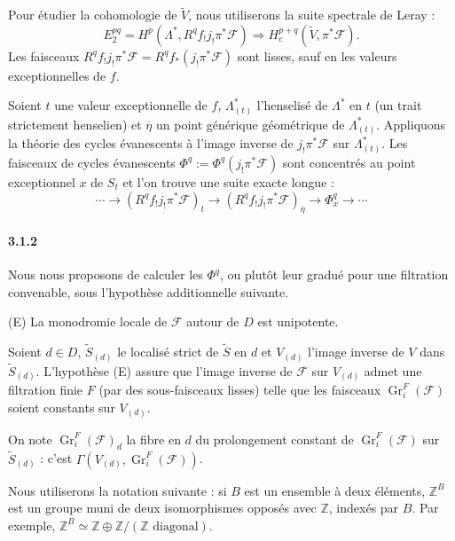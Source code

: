 \documentclass[12pt,a4paper]{article}
\theoremstyle{plain}
\theoremstyle{definition}
\theoremstyle{remark}
\DeclareMathOperator{\Gr}{Gr}
\newcommand{\ZZ}{{\mathbb{Z}}}
\begin{document}
Pour \'etudier la cohomologie de $\widetilde{V}$, nous utiliserons la suite spectrale de Leray :
\begin{equation}\label{eq:3.1.1.5}
E_2^{pq} = H^p(\Lambda^*, R^q f_! j_! \pi^* \mathscr{F}) \Rightarrow H_c^{p+q}(\widetilde{V}, \pi^*\mathscr{F}).
\end{equation}
Les faisceaux $R^q f_! j_! \pi^*\mathscr{F} = R^q f_*(j_! \pi^*\mathscr{F})$ sont lisses, sauf en les valeurs exceptionnelles de $f$.

Soient $t$ une valeur exceptionnelle de $f$, $\Lambda^*_{(t)}$ l'henselis\'e de $\Lambda^*$ en $t$ (un trait strictement henselien) et $\overline{\eta}$ un point g\'en\'erique g\'eom\'etrique de $\Lambda^*_{(t)}$. Appliquons la th\'eorie des cycles \'evanescents \`a l'image inverse de $j_! \pi^*\mathscr{F}$ sur $\Lambda^*_{(t)}$. Les faisceaux de cycles \'evanescents $\Phi^q := \Phi^q(j_! \pi^*\mathscr{F})$ sont concentr\'es au point exceptionnel $x$ de $S_t$ et l'on trouve une suite exacte longue :
\begin{equation}\label{eq:3.1.1.6}
\cdots \to (R^q f_! j_! \pi^*\mathscr{F})_t \to (R^q f_! j_! \pi^*\mathscr{F})_{\overline{\eta}} \to \Phi^q_x \to \cdots
\end{equation}

\paragraph{3.1.2}
Nous nous proposons de calculer les $\Phi^q$, ou plut\^ot leur gradu\'e pour une filtration convenable, sous l'hypoth\`ese additionnelle suivante.

(E) La monodromie locale de $\mathscr{F}$ autour de $D$ est unipotente.

Soient $d \in D$, $\widetilde{S}_{(d)}$ le localis\'e strict de $\widetilde{S}$ en $d$ et $V_{(d)}$ l'image inverse de $V$ dans $\widetilde{S}_{(d)}$. L'hypoth\`ese (E) assure que l'image inverse de $\mathscr{F}$ sur $V_{(d)}$ admet une filtration finie $F$ (par des sous-faisceaux lisses) telle que les faisceaux $\Gr_i^F(\mathscr{F})$ soient constants sur $V_{(d)}$.

On note $\Gr_i^F(\mathscr{F})_d$ la fibre en $d$ du prolongement constant de $\Gr_i^F(\mathscr{F})$ sur $\widetilde{S}_{(d)}$ : c'est $\Gamma(V_{(d)}, \Gr_i^F(\mathscr{F}))$.


Nous utiliserons la notation suivante : si $B$ est un ensemble \`a deux \'el\'ements, $\ZZ^B$ est un groupe muni de deux isomorphismes oppos\'es avec $\ZZ$, index\'es par $B$. Par exemple, $\ZZ^B \simeq \ZZ \oplus \ZZ / (\ZZ \text{ diagonal})$.
\end{document}
